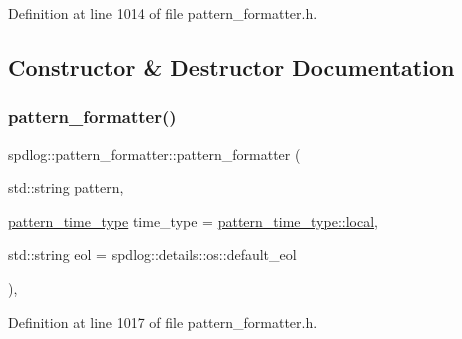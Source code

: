Definition at line 1014 of file pattern\+\_\+formatter.\+h.



\subsection{Constructor \& Destructor Documentation}
\mbox{\label{classspdlog_1_1pattern__formatter_a77d5f83cf0e00029d5796b81de1e1a9e}} 
\subsubsection{\texorpdfstring{pattern\+\_\+formatter()}{pattern\_formatter()}\hspace{0.1cm}{\footnotesize\ttfamily [1/3]}}
{\footnotesize\ttfamily spdlog\+::pattern\+\_\+formatter\+::pattern\+\_\+formatter (\begin{DoxyParamCaption}\item[{std\+::string}]{pattern,  }\item[{\hyperlink{namespacespdlog_ad598fbd8338772e66ae09e8723a07ced}{pattern\+\_\+time\+\_\+type}}]{time\+\_\+type = {\ttfamily \hyperlink{namespacespdlog_ad598fbd8338772e66ae09e8723a07cedaf5ddaf0ca7929578b408c909429f68f2}{pattern\+\_\+time\+\_\+type\+::local}},  }\item[{std\+::string}]{eol = {\ttfamily spdlog\+:\+:details\+:\+:os\+:\+:default\+\_\+eol} }\end{DoxyParamCaption})\hspace{0.3cm}{\ttfamily [inline]}, {\ttfamily [explicit]}}



Definition at line 1017 of file pattern\+\_\+formatter.\+h.

\mbox{\label{classspdlog_1_1pattern__formatter_a4c11f41c2e6a62ac10e80170c0958192}} 
